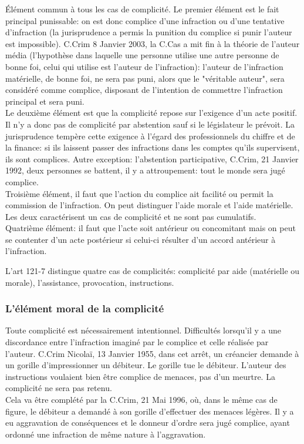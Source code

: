 \documentclass[10pt, a4paper, openany]{book}
\begin{document}
Élément commun à tous les cas de complicité. Le premier élément est le fait principal punissable: on est donc complice d'une infraction ou d'une tentative d'infraction (la jurisprudence a permis la punition du complice si punir l'auteur est impossible). C.Crim 8 Janvier 2003, la C.Cas a mit fin à la théorie de l'auteur média (l'hypothèse dans laquelle une personne utilise une autre personne de bonne foi, celui qui utilise est l'auteur de l'infraction): l'auteur de l'infraction matérielle, de bonne foi, ne sera pas puni, alors que le "véritable auteur", sera considéré comme complice, disposant de l'intention de commettre l'infraction principal et sera puni. \\
Le deuxième élément est que la complicité repose sur l'exigence d'un acte positif. Il n'y a donc pas de complicité par abstention sauf si le législateur le prévoit. La jurisprudence tempère cette exigence à l'égard des professionnels du chiffre et de la finance: si ils laissent passer des infractions dans les comptes qu'ils supervisent, ils sont complices. Autre exception: l'abstention participative, C.Crim, 21 Janvier 1992, deux personnes se battent, il y a attroupement: tout le monde sera jugé complice. \\
Troisième élément, il faut que l'action du complice ait facilité ou permit la commission de l'infraction. On peut distinguer l'aide morale et l'aide matérielle. Les deux caractérisent un cas de complicité et ne sont pas cumulatifs. \\
Quatrième élément: il faut que l'acte soit antérieur ou concomitant mais on peut se contenter d'un acte postérieur si celui-ci résulter d'un accord antérieur à l'infraction. 


L'art 121-7 distingue quatre cas de complicités: complicité par aide (matérielle ou morale), l'assistance, provocation, instructions. 

\subsubsection{L'élément moral de la complicité}

Toute complicité est nécessairement intentionnel. Difficultés lorsqu'il y a une discordance entre l'infraction imaginé par le complice et celle réalisée par l'auteur. C.Crim Nicolaï, 13 Janvier 1955, dans cet arrêt, un créancier demande à un gorille d'impressionner un débiteur. Le gorille tue le débiteur. L'auteur des instructions voulaient bien être complice de menaces, pas d'un meurtre. La complicité ne sera pas retenu. \\
Cela va être complété par la C.Crim, 21 Mai 1996, où, dans le même cas de figure, le débiteur a demandé à son gorille d'effectuer des menaces légères. Il y a eu aggravation de conséquences et le donneur d'ordre sera jugé complice, ayant ordonné une infraction de même nature à l'aggravation. 
\end{document}
